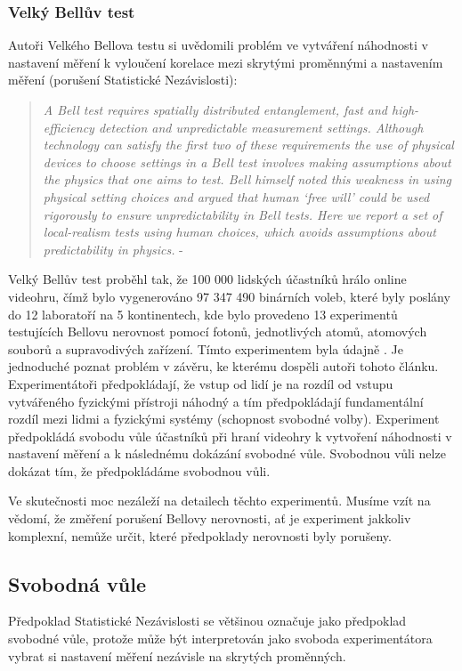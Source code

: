 \subsubsection{Velký Bellův test}
Autoři Velkého Bellova testu si uvědomili problém ve vytváření náhodnosti v nastavení měření k vyloučení korelace mezi skrytými proměnnými a nastavením měření (porušení Statistické Nezávislosti):
\begin{quote}
    \emph{A Bell test requires spatially distributed entanglement, fast and high-efficiency detection and unpredictable measurement settings. Although technology can satisfy the first two of these requirements the use of physical devices to choose settings in a Bell test involves making assumptions about the physics that one aims to test. Bell himself noted this weakness in using physical setting choices and argued that human ‘free will’ could be used rigorously to ensure unpredictability in Bell tests. Here we report a set of local-realism tests using human choices, which avoids assumptions about predictability in physics.} - \cite{BigBTest}
\end{quote}

Velký Bellův test proběhl tak, že 100 000 lidských účastníků hrálo online videohru, čímž bylo vygenerováno 97 347 490 binárních voleb, které byly poslány do 12 laboratoří na 5 kontinentech, kde bylo provedeno 13 experimentů testujících Bellovu nerovnost pomocí fotonů, jednotlivých atomů, atomových souborů a supravodivých zařízení. Tímto experimentem byla údajně . Je jednoduché poznat problém v závěru, ke kterému dospěli autoři tohoto článku. Experimentátoři předpokládají, že vstup od lidí je na rozdíl od vstupu vytvářeného fyzickými přístroji náhodný a tím předpokládají fundamentální rozdíl mezi lidmi a fyzickými systémy (schopnost svobodné volby). Experiment předpokládá svobodu vůle účastníků při hraní videohry k vytvoření náhodnosti v nastavení měření a k následnému dokázání svobodné vůle. Svobodnou vůli nelze dokázat tím, že předpokládáme svobodnou vůli.

Ve skutečnosti moc nezáleží na detailech těchto experimentů. Musíme vzít na vědomí, že změření porušení Bellovy nerovnosti, ať je experiment jakkoliv komplexní, nemůže určit, které předpoklady nerovnosti byly porušeny.

\clearpage

\subsection{Svobodná vůle}
Předpoklad Statistické Nezávislosti se většinou označuje jako předpoklad svobodné vůle, protože může být interpretován jako svoboda experimentátora vybrat si nastavení měření nezávisle na skrytých proměnných.

